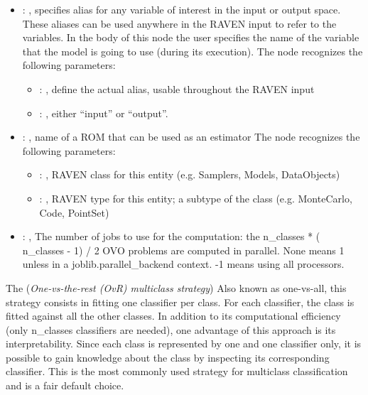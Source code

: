 \begin{itemize}
    \item {}: , 
      specifies alias for         any variable of interest in the input or output space. These
      aliases can be used anywhere in the RAVEN input to         refer to the variables. In the body
      of this node the user specifies the name of the variable that the model is going to use
      (during its execution).
      The  node recognizes the following parameters:
        \begin{itemize}
          \item {}: , 
            define the actual alias, usable throughout the RAVEN input
          \item {}: , 
            either ``input'' or ``output''.
      \end{itemize}

    \item {}: , 
      name of a ROM that can be used as an estimator
      The  node recognizes the following parameters:
        \begin{itemize}
          \item {}: , 
            RAVEN class for this entity (e.g. Samplers, Models, DataObjects)
          \item {}: , 
            RAVEN type for this entity; a subtype of the class (e.g. MonteCarlo, Code, PointSet)
      \end{itemize}

    \item {}: , 
      The number of jobs to use for the computation: the n\_classes * ( n\_classes - 1) / 2 OVO
      problems are computed in parallel. None means 1 unless in a joblib.parallel\_backend
      context. -1 means using all processors.
  \end{itemize}
 The  (\textit{One-vs-the-rest (OvR) multiclass strategy})
 Also known as one-vs-all, this strategy consists in fitting one classifier per class. For each
 classifier, the class is fitted against all the other classes. In addition to its computational
 efficiency (only n\_classes classifiers are needed), one advantage of this approach is its
 interpretability. Since each class is represented by one and one classifier only, it is
 possible to gain knowledge about the class by inspecting its corresponding classifier.
 This is the most commonly used strategy for multiclass classification and is a fair default choice.

